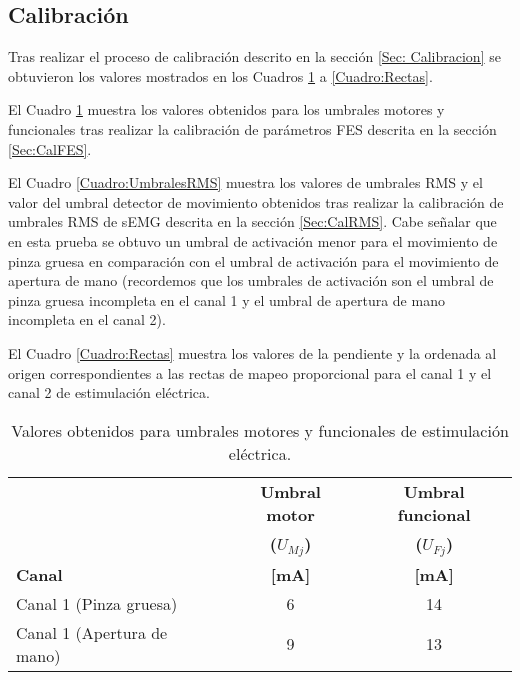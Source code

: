 \subsection{Calibración}
Tras realizar el proceso de calibración descrito en la sección \ref{Sec: Calibracion} se obtuvieron los valores mostrados en los Cuadros \ref{Cuadro:UmbralesFES} a \ref{Cuadro:Rectas}.

El Cuadro \ref{Cuadro:UmbralesFES} muestra los valores obtenidos para los umbrales motores y funcionales tras realizar la calibración de parámetros FES descrita en la sección \ref{Sec:CalFES}.

El Cuadro \ref{Cuadro:UmbralesRMS} muestra los valores de umbrales RMS y el valor del umbral detector de movimiento obtenidos tras realizar la calibración de umbrales RMS de sEMG descrita en la sección \ref{Sec:CalRMS}. Cabe señalar que en esta prueba se obtuvo un umbral de activación menor para el movimiento de pinza gruesa en comparación con el umbral de activación para el movimiento de apertura de mano (recordemos que los umbrales de activación son el umbral de pinza gruesa incompleta en el canal 1 y el umbral de apertura de mano incompleta en el canal 2).

El Cuadro \ref{Cuadro:Rectas} muestra los valores de la pendiente y la ordenada al origen correspondientes a las rectas de mapeo proporcional para el canal 1 y el canal 2 de estimulación eléctrica.

\begin{table}[htbp]
	\centering
	\begin{tabular}{|l|c|c|}
	\hline
	\textbf{} & \textbf{Umbral motor} & \textbf{Umbral funcional}\\
	\textbf{} & \textbf{($U_{Mj}$)} & \textbf{($U_{Fj}$)}\\
	\textbf{Canal} & \textbf{[mA]} & \textbf{[mA]}\\ \hline	\hline
	Canal 1 (Pinza gruesa) & 6 & 14\\ \hline
	Canal 1 (Apertura de mano) & 9 & 13\\ \hline
	\end{tabular}
	\caption{Valores obtenidos para umbrales motores y funcionales de estimulación eléctrica.}
	\label{Cuadro:UmbralesFES}
\end{table}

